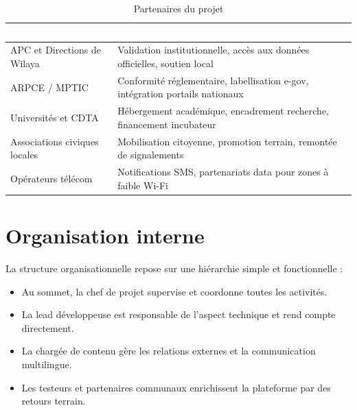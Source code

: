 \documentclass[12pt,a4paper]{report}
\newcommand{\thdcell}[1]{%
  \cellcolor{tabhead}\textbf{\textcolor{white}{#1}}%
}
\begin{document}
\begin{table}[H]
  \centering
  \caption{Partenaires du projet}
  \renewcommand{\arraystretch}{1.4}
  \begin{tabularx}{\linewidth}{lX}
    \toprule
    \rowcolor{primary}
    \thdcell{Partenaire} & \thdcell{Rôle et apport} \\
    \midrule

    APC et Directions de Wilaya &
    Validation institutionnelle, accès aux données officielles, soutien local \\

    \rowcolor{lightgray}
    ARPCE / MPTIC &
    Conformité réglementaire, labellisation e-gov, intégration portails
    nationaux \\

    Universités et CDTA &
    Hébergement académique, encadrement recherche, financement incubateur \\

    \rowcolor{lightgray}
    Associations civiques locales &
    Mobilisation citoyenne, promotion terrain, remontée de signalements \\

    Opérateurs télécom &
    Notifications SMS, partenariats data pour zones à faible Wi-Fi \\

    \bottomrule
  \end{tabularx}
\end{table}

\section{Organisation interne}

La structure organisationnelle repose sur une hiérarchie simple et
fonctionnelle :
\begin{itemize}
  \item Au sommet, la chef de projet supervise et coordonne toutes les
        activités.
  \item La lead développeuse est responsable de l'aspect technique et rend
        compte directement.
  \item La chargée de contenu gère les relations externes et la communication
        multilingue.
  \item Les testeurs et partenaires communaux enrichissent la plateforme par
        des retours terrain.
\end{itemize}

\end{document}
